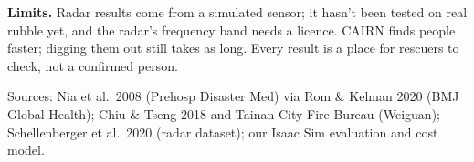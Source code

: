 \documentclass[10pt,a4paper]{extarticle}
\begin{document}
{\small\textbf{Limits.} Radar results come from a simulated sensor; it hasn't been tested on real rubble yet, and the radar's frequency band needs a licence. CAIRN finds people faster; digging them out still takes as long. Every result is a place for rescuers to check, not a confirmed person.}

\vspace{0.3em}
{\footnotesize\color{cairngrey} Sources: Nia et al.\ 2008 (Prehosp Disaster Med) via Rom \& Kelman 2020 (BMJ Global Health); Chiu \& Tseng 2018 and Tainan City Fire Bureau (Weiguan); Schellenberger et al.\ 2020 (radar dataset); our Isaac Sim evaluation and cost model.}
\end{document}
